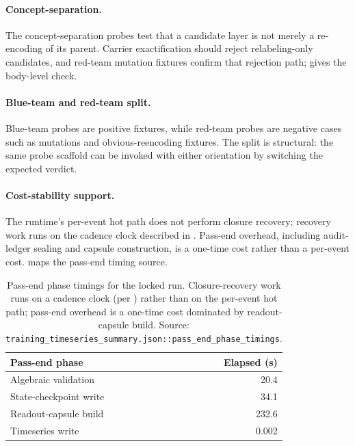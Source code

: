 \documentclass{article}
\theoremstyle{definition}
\begin{document}
\paragraph{Concept-separation.}
The concept-separation probes test that a candidate layer is not merely a re-encoding of its parent. Carrier exactification should reject relabeling-only candidates, and red-team mutation fixtures confirm that rejection path;  gives the body-level check.

\paragraph{Blue-team and red-team split.}
Blue-team probes are positive fixtures, while red-team probes are negative cases such as mutations and obvious-reencoding fixtures. The split is structural: the same probe scaffold can be invoked with either orientation by switching the expected verdict.

\paragraph{Cost-stability support.}
The runtime's per-event hot path does not perform closure recovery; recovery work runs on the cadence clock described in . Pass-end overhead, including audit-ledger sealing and capsule construction, is a one-time cost rather than a per-event cost.  maps the pass-end timing source.

\begin{table}[t]
  \centering
  \small
  \caption{Pass-end phase timings for the locked run. Closure-recovery work runs on a cadence clock (per ) rather than on the per-event hot path; pass-end overhead is a one-time cost dominated by readout-capsule build. Source: \texttt{training\_timeseries\_summary.json::pass\_end\_phase\_timings}.}
  \label{tab:cost-stability}
  \begin{tabularx}{\linewidth}{@{}>{\raggedright\arraybackslash}Xr@{}}
    \toprule
    Pass-end phase & Elapsed (s) \\
    \midrule
    Algebraic validation & 20.4 \\
    State-checkpoint write & 34.1 \\
    Readout-capsule build & 232.6 \\
    Timeseries write & 0.002 \\
    \bottomrule
  \end{tabularx}
\end{table}
  
\end{document}
